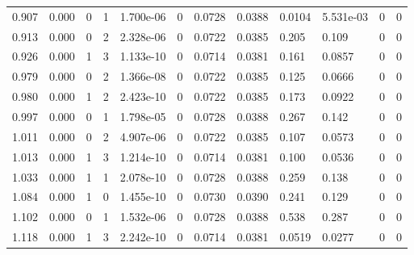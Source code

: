 \documentclass[preview]{standalone}
\begin{document}
{{\begin{tabular}{L{1.2cm}C{1.2cm} C{0.3cm}C{0.5cm} C{1.4cm}C{1.4cm} C{1.4cm}C{1.4cm} C{1.6cm}C{1.6cm} C{1.6cm}C{1.6cm}}
  0.907  &  0.000  & 0     &  1 &  1.700e-06  & 0  &  0.0728&   0.0388& 0.0104 & 5.531e-03   &  0 & 0  \\ 
  0.913  &  0.000  & 0     &  2 &  2.328e-06  & 0  &  0.0722&   0.0385& 0.205 & 0.109   &  0 & 0  \\ 
  0.926  &  0.000  & 1     &  3 &  1.133e-10  & 0  &  0.0714&   0.0381& 0.161 & 0.0857   &  0 & 0  \\ 
  0.979  &  0.000  & 0     &  2 &  1.366e-08  & 0  &  0.0722&   0.0385& 0.125 & 0.0666   &  0 & 0  \\ 
  0.980  &  0.000  & 1     &  2 &  2.423e-10  & 0  &  0.0722&   0.0385& 0.173 & 0.0922   &  0 & 0  \\ 
  0.997  &  0.000  & 0     &  1 &  1.798e-05  & 0  &  0.0728&   0.0388& 0.267 & 0.142   &  0 & 0  \\ 
  1.011  &  0.000  & 0     &  2 &  4.907e-06  & 0  &  0.0722&   0.0385& 0.107 & 0.0573   &  0 & 0  \\ 
  1.013  &  0.000  & 1     &  3 &  1.214e-10  & 0  &  0.0714&   0.0381& 0.100 & 0.0536   &  0 & 0  \\ 
  1.033  &  0.000  & 1     &  1 &  2.078e-10  & 0  &  0.0728&   0.0388& 0.259 & 0.138   &  0 & 0  \\ 
  1.084  &  0.000  & 1     &  0 &  1.455e-10  & 0  &  0.0730&   0.0390& 0.241 & 0.129   &  0 & 0  \\ 
  1.102  &  0.000  & 0     &  1 &  1.532e-06  & 0  &  0.0728&   0.0388& 0.538 & 0.287   &  0 & 0  \\ 
  1.118  &  0.000  & 1     &  3 &  2.242e-10  & 0  &  0.0714&   0.0381& 0.0519 & 0.0277   &  0 & 0  \\ 
\hline 
\end{tabular} 

}}
\end{document}
